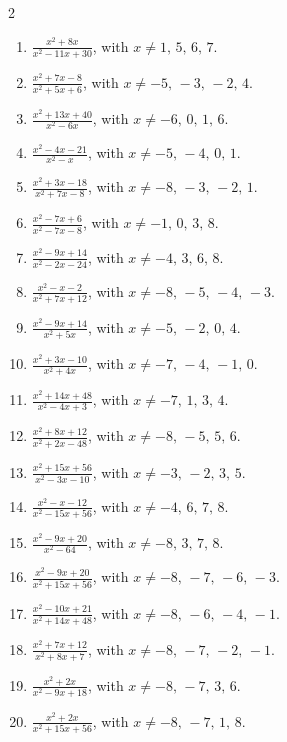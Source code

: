 \documentclass[11pt,oneside]{book}
\begin{document}
\begin{multicols}{2}
\begin{enumerate}[leftmargin=*,label=\textbf{K\arabic*.},itemsep=0.45\baselineskip]
\item $\displaystyle \frac{x^{2} + 8 x}{x^{2} - 11 x + 30}$, with $x\ne 1,\,5,\,6,\,7$.
\item $\displaystyle \frac{x^{2} + 7 x - 8}{x^{2} + 5 x + 6}$, with $x\ne -5,\,-3,\,-2,\,4$.
\item $\displaystyle \frac{x^{2} + 13 x + 40}{x^{2} - 6 x}$, with $x\ne -6,\,0,\,1,\,6$.
\item $\displaystyle \frac{x^{2} - 4 x - 21}{x^{2} - x}$, with $x\ne -5,\,-4,\,0,\,1$.
\item $\displaystyle \frac{x^{2} + 3 x - 18}{x^{2} + 7 x - 8}$, with $x\ne -8,\,-3,\,-2,\,1$.
\item $\displaystyle \frac{x^{2} - 7 x + 6}{x^{2} - 7 x - 8}$, with $x\ne -1,\,0,\,3,\,8$.
\item $\displaystyle \frac{x^{2} - 9 x + 14}{x^{2} - 2 x - 24}$, with $x\ne -4,\,3,\,6,\,8$.
\item $\displaystyle \frac{x^{2} - x - 2}{x^{2} + 7 x + 12}$, with $x\ne -8,\,-5,\,-4,\,-3$.
\item $\displaystyle \frac{x^{2} - 9 x + 14}{x^{2} + 5 x}$, with $x\ne -5,\,-2,\,0,\,4$.
\item $\displaystyle \frac{x^{2} + 3 x - 10}{x^{2} + 4 x}$, with $x\ne -7,\,-4,\,-1,\,0$.
\item $\displaystyle \frac{x^{2} + 14 x + 48}{x^{2} - 4 x + 3}$, with $x\ne -7,\,1,\,3,\,4$.
\item $\displaystyle \frac{x^{2} + 8 x + 12}{x^{2} + 2 x - 48}$, with $x\ne -8,\,-5,\,5,\,6$.
\item $\displaystyle \frac{x^{2} + 15 x + 56}{x^{2} - 3 x - 10}$, with $x\ne -3,\,-2,\,3,\,5$.
\item $\displaystyle \frac{x^{2} - x - 12}{x^{2} - 15 x + 56}$, with $x\ne -4,\,6,\,7,\,8$.
\item $\displaystyle \frac{x^{2} - 9 x + 20}{x^{2} - 64}$, with $x\ne -8,\,3,\,7,\,8$.
\item $\displaystyle \frac{x^{2} - 9 x + 20}{x^{2} + 15 x + 56}$, with $x\ne -8,\,-7,\,-6,\,-3$.
\item $\displaystyle \frac{x^{2} - 10 x + 21}{x^{2} + 14 x + 48}$, with $x\ne -8,\,-6,\,-4,\,-1$.
\item $\displaystyle \frac{x^{2} + 7 x + 12}{x^{2} + 8 x + 7}$, with $x\ne -8,\,-7,\,-2,\,-1$.
\item $\displaystyle \frac{x^{2} + 2 x}{x^{2} - 9 x + 18}$, with $x\ne -8,\,-7,\,3,\,6$.
\item $\displaystyle \frac{x^{2} + 2 x}{x^{2} + 15 x + 56}$, with $x\ne -8,\,-7,\,1,\,8$.

\end{enumerate}
\end{multicols}
\end{document}

